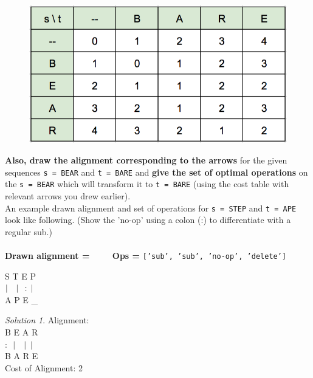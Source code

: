 \documentclass[12pt]{article}
\theoremstyle{remark}
\newtheorem*{solution}{Solution}
\begin{document}
\begin{enumerate}
\begin{enumerate}
    \begin{figure}[h!]
    \begin{center}
    \includegraphics[scale=0.6]{PS10a_Q2.png}
    \end{center}
    \end{figure}
    
    \textbf{Also, draw the alignment corresponding to the arrows} for the given sequences \texttt{s = BEAR} and \texttt{t = BARE} and \textbf{give the set of optimal operations} on the \texttt{s = BEAR} which will transform it to \texttt{t = BARE} (using the cost table with relevant arrows you drew earlier). \\
    An example drawn alignment and set of operations for \texttt{s = STEP} and \texttt{t = APE} look like following. (Show the 'no-op' using a colon (:) to differentiate with a regular sub.)\\\\
    \textbf{Drawn alignment =} $\quad\quad$      \textbf{Ops = }\texttt{['sub', 'sub', 'no-op', 'delete']}
    
    S  T  E  P\\
    $\vert\enspace\enspace\vert\enspace:\thinspace\vert$  \\
    A  P  E  \_\\
    
    \begin{solution}
    Alignment: \\
    
    \pagebreak
    B  E  A  R\\
    $:\enspace\vert\enspace\enspace\vert\enspace\vert$  \\
    B  A  R  E\\
Cost of Alignment: 2
    \end{solution}
    

\end{enumerate}
\end{enumerate}
\end{document}
